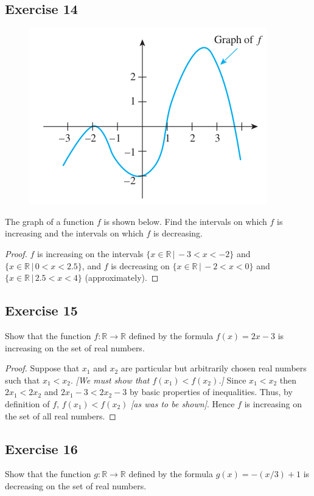 \documentclass[14pt]{extarticle}
\newcommand{\R}{\mathbb{R}}
\begin{document}
\subsection{Exercise 14}
\begin{figure}[ht!]
\centering
\includegraphics[scale=0.5]{../images/11.1.14.png}
\end{figure}

The graph of a function \(f\) is shown below. Find the intervals on which \(f\) is increasing and the intervals on 
which \(f\) is decreasing.

\begin{proof}
\(f\) is increasing on the intervals \(\{x \in \R \,|\, -3 < x < -2\}\) and \(\{x \in \R \,|\, 0 < x < 2.5\}\), and \(f\) is 
decreasing on \(\{x \in \R \,|\, -2 < x < 0\}\) and \(\{x \in \R \,|\, 2.5 < x < 4\}\) (approximately).
\end{proof}

\subsection{Exercise 15}
Show that the function \(f: \R \to \R\) defined by the formula \(f(x) = 2x - 3\) is increasing on the set of real numbers.

\begin{proof}
Suppose that \(x_1\) and \(x_2\) are particular but arbitrarily chosen real numbers such that \(x_1 < x_2\). 
{\it [We must show that \(f(x_1) < f(x_2)\).]} Since \(x_1 < x_2\) then \(2x_1 < 2x_2\) and \(2x_1 - 3 < 2x_2 - 3\) by 
basic properties of inequalities. Thus, by definition of \(f\), \(f(x_1) < f(x_2)\) {\it [as was to be shown]}. 
Hence \(f\) is increasing on the set of all real numbers.
\end{proof}

\subsection{Exercise 16}
Show that the function \(g: \R \to \R\) defined by the formula \(g(x) = -(x/3) + 1\) is decreasing on the set of real 
numbers.
\end{document}
